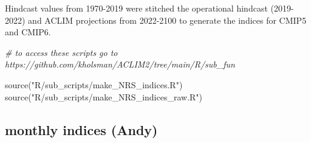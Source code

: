 \documentclass[
]{article}
\newenvironment{Shaded}{\begin{snugshade}}{\end{snugshade}}
\newcommand{\CommentTok}[1]{\textcolor[rgb]{0.56,0.35,0.01}{\textit{#1}}}
\newcommand{\FunctionTok}[1]{\textcolor[rgb]{0.00,0.00,0.00}{#1}}
\newcommand{\NormalTok}[1]{#1}
\newcommand{\StringTok}[1]{\textcolor[rgb]{0.31,0.60,0.02}{#1}}
\begin{document}
Hindcast values from 1970-2019 were stitched the operational hindcast
(2019-2022) and ACLIM projections from 2022-2100 to generate the indices
for CMIP5 and CMIP6.

\begin{Shaded}
\begin{Highlighting}[]
  \CommentTok{\# to access these scripts go to https://github.com/kholsman/ACLIM2/tree/main/R/sub\_fun}

 \FunctionTok{source}\NormalTok{(}\StringTok{"R/sub\_scripts/make\_NRS\_indices.R"}\NormalTok{)}
 \FunctionTok{source}\NormalTok{(}\StringTok{"R/sub\_scripts/make\_NRS\_indices\_raw.R"}\NormalTok{)}
\end{Highlighting}
\end{Shaded}

\hypertarget{monthly-indices-andy}{%
\subsection{monthly indices (Andy)}\label{monthly-indices-andy}}
\end{document}
